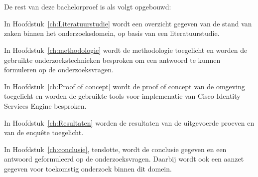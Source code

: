 \section{}
\label{sec:opzet-bachelorproef}


De rest van deze bachelorproef is als volgt opgebouwd:

In Hoofdstuk~\ref{ch:Literatuurstudie} wordt een overzicht gegeven van de stand van zaken binnen het onderzoeksdomein, op basis van een literatuurstudie.

In Hoofdstuk~\ref{ch:methodologie} wordt de methodologie toegelicht en worden de gebruikte onderzoekstechnieken besproken om een antwoord te kunnen formuleren op de onderzoeksvragen.

In Hoofdstuk~\ref{ch:Proof of concept} wordt de proof of concept van de omgeving toegelicht en worden de gebruikte tools voor implemenatie van Cisco Identity Services Engine besproken. 

In Hoofdstuk~\ref{ch:Resultaten} worden de resultaten van de uitgevoerde proeven en van de enquête toegelicht.

In Hoofdstuk~\ref{ch:conclusie}, tenslotte, wordt de conclusie gegeven en een antwoord geformuleerd op de onderzoeksvragen. Daarbij wordt ook een aanzet gegeven voor toekomstig onderzoek binnen dit domein.